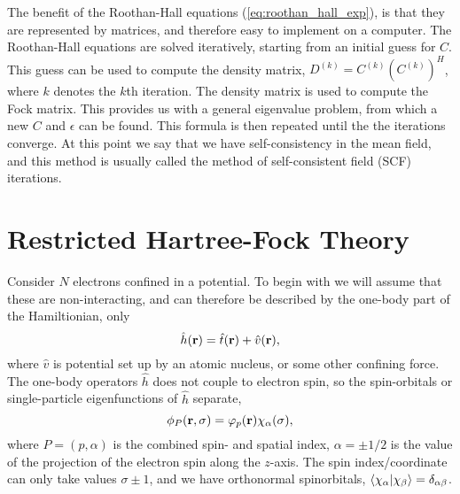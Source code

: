 The benefit of the Roothan-Hall equations (\autoref{eq:roothan_hall_exp}), is that they 
are represented by matrices, and therefore easy to implement on a computer. The
Roothan-Hall equations are solved iteratively, starting from an initial guess for $C$. 
This guess can be used to compute the density matrix, 
$D^{(k)} = C^{(k)}(C^{(k)})^H$, where $k$ denotes the $k$th iteration. The density 
matrix is used to compute the Fock matrix. This provides us with a general eigenvalue 
problem, from which a new $C$ and $\epsilon$ can be found. This formula is then repeated
until the the iterations converge. At this point we say that we have self-consistency 
in the mean field, and this method is usually called the method of self-consistent
field (SCF) iterations.

\section{Restricted Hartree-Fock Theory}

Consider $N$ electrons confined in a potential. 
To begin with we will assume that these are non-interacting, and can therefore be 
described by the one-body part of the Hamiltionian, only
\begin{equation}
    \hat{h}(\vb{r}) = \hat{t}(\vb{r}) + \hat{v}(\vb{r}),
\end{equation}
where $\hat{v}$ is potential set up by an atomic nucleus, or some other confining
force. The one-body operators $\hat{h}$ does not couple to electron spin, so the 
spin-orbitals or single-particle eigenfunctions of $\hat{h}$ separate,
\begin{equation}
    \phi_P(\vb{r}, \sigma) = \varphi_p(\vb{r})\chi_\alpha(\sigma),
\end{equation}
where $P = (p, \alpha)$ is the combined spin- and spatial index, $\alpha = \pm 1/2$
is the value of the projection of the electron spin along the $z$-axis. The spin 
index/coordinate can only take values $\sigma \pm 1$, and we have orthonormal 
spinorbitals, $\braket{\chi_\alpha}{\chi_\beta} = \delta_{\alpha\beta}$. 

